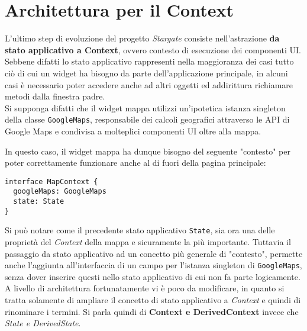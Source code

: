 
\chapter{Architettura per il Context}
\label{cap:architettura-context}

L'ultimo step di evoluzione del progetto \textit{Stargate} consiste nell'astrazione \textbf{da stato applicativo a Context}, ovvero contesto di esecuzione dei componenti UI. Sebbene difatti lo stato applicativo rappresenti nella maggioranza dei casi tutto ciò di cui un widget ha bisogno da parte dell'applicazione principale, in alcuni casi è necessario poter accedere anche ad altri oggetti ed addirittura richiamare metodi dalla finestra padre. \\

Si supponga difatti che il widget mappa utilizzi un'ipotetica istanza \gls{singleton} della classe \texttt{GoogleMaps}, responsabile dei calcoli geografici attraverso le API di Google Maps e condivisa a molteplici componenti UI oltre alla mappa.

In questo caso, il widget mappa ha dunque bisogno del seguente "contesto" per poter correttamente funzionare anche al di fuori della pagina principale: \\

\begin{lstlisting}[language={[Sharp]C},basicstyle=\footnotesize]
interface MapContext {
  googleMaps: GoogleMaps
  state: State
}
\end{lstlisting}

Si può notare come il precedente stato applicativo \texttt{State}, sia ora una delle proprietà del \textit{Context} della mappa e sicuramente la più importante. Tuttavia il passaggio da stato applicativo ad un concetto più generale di "contesto", permette anche l'aggiunta all'interfaccia di un campo per l'istanza singleton di \texttt{GoogleMaps}, senza dover inserire questi nello stato applicativo di cui non fa parte logicamente. \\

A livello di architettura fortunatamente vi è poco da modificare, in quanto si tratta solamente di ampliare il concetto di stato applicativo a \textit{Context} e quindi di rinominare i termini. Si parla quindi di \textbf{Context e DerivedContext} invece che \textit{State e DerivedState}.

